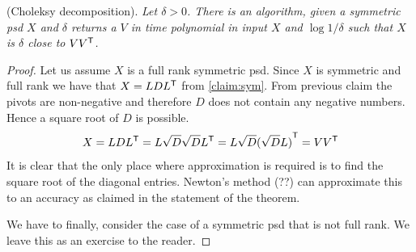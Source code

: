 \documentclass[12pt,
    driverfallback=dvipdfm,
 	openany,
    a4paper,
    toc=bibliography,
    twoside,
    numbers=noenddot]{article}              %
\begin{document}
 (Choleksy decomposition). 
\emph{Let $\delta > 0$. There is an algorithm, given a symmetric psd $X$ and $\delta$ returns a $V$ in
 time polynomial in input $X$ and $\log 1/\delta$ such that $X$ is $\delta$ close to $V {V}^{\mathsf{T}}$.}
\begin{proof}
Let us assume $X$ is a full rank symmetric psd. Since $X$ is symmetric and full rank we have that $X = LD {L}^{\mathsf{T}}$ from \cref{claim:sym}. From previous claim the pivots are non-negative and therefore $D$ does not contain any negative numbers. Hence a square root of $D$ is possible.
\[
X = LD {L}^{\mathsf{T}} = L \sqrt D \sqrt D {L}^{\mathsf{T}} = L \sqrt D {(\sqrt D L)}^{\mathsf{T}} = V {V}^{\mathsf{T}}
\]
It is clear that the only place where approximation is required is to find the square root of the diagonal entries. Newton's method (??) can approximate this to an accuracy as claimed in the statement of the theorem.

We have to finally, consider the case of a symmetric psd that is not full rank. We leave this as an exercise to the reader. 
\end{proof} 



\end{document}

